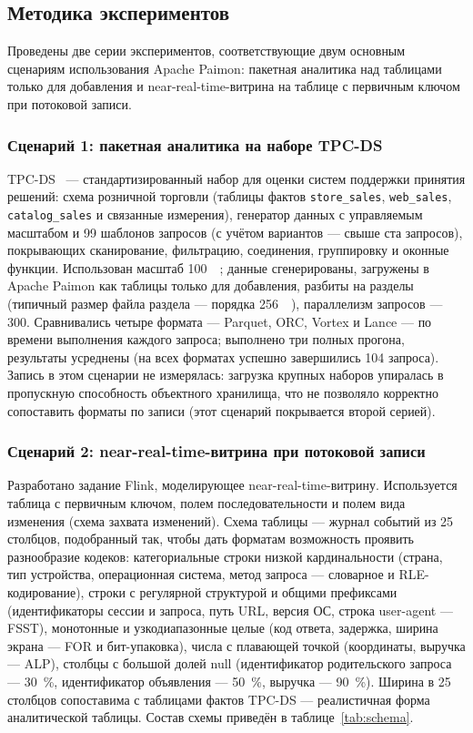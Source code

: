\subsection{Методика экспериментов}
\label{subsec:methodology}

Проведены две серии экспериментов, соответствующие двум основным сценариям
использования Apache Paimon: пакетная аналитика над таблицами только для добавления и
near-real-time-витрина на таблице с первичным ключом при потоковой записи.

\subsubsection{Сценарий 1: пакетная аналитика на наборе TPC-DS}

TPC-DS~\cite{tpcds-spec} --- стандартизированный набор для оценки систем поддержки принятия решений:
схема розничной торговли (таблицы фактов \texttt{store\_sales}, \texttt{web\_sales},
\texttt{catalog\_sales} и связанные измерения), генератор данных с управляемым
масштабом и \num{99} шаблонов запросов (с учётом вариантов --- свыше ста запросов),
покрывающих сканирование, фильтрацию, соединения, группировку и оконные функции.
Использован масштаб \SI{100}{\giga\byte}; данные сгенерированы, загружены в Apache
Paimon как таблицы только для добавления, разбиты на разделы (типичный размер файла
раздела --- порядка \SI{256}{\mega\byte}), параллелизм запросов --- 300. Сравнивались
четыре формата --- Parquet, ORC, Vortex и Lance --- по времени выполнения каждого
запроса; выполнено три полных прогона, результаты усреднены (на всех форматах
успешно завершились \num{104} запроса). Запись в
этом сценарии не измерялась: загрузка крупных наборов упиралась в пропускную
способность объектного хранилища, что не позволяло корректно сопоставить форматы по
записи (этот сценарий покрывается второй серией).

\subsubsection{Сценарий 2: near-real-time-витрина при потоковой записи}

Разработано задание Flink, моделирующее near-real-time-витрину. Используется таблица
с первичным ключом, полем последовательности и полем вида изменения (схема захвата
изменений). Схема таблицы --- журнал событий из 25 столбцов, подобранный так, чтобы
дать форматам возможность проявить разнообразие кодеков: категориальные строки
низкой кардинальности (страна, тип устройства, операционная система, метод запроса
--- словарное и RLE-кодирование), строки с регулярной структурой и общими
префиксами (идентификаторы сессии и запроса, путь URL, версия ОС, строка
user-agent --- FSST), монотонные и узкодиапазонные целые (код ответа, задержка,
ширина экрана --- FOR и бит-упаковка), числа с плавающей точкой (координаты, выручка
--- ALP), столбцы с большой долей null (идентификатор родительского запроса ---
\SI{30}{\percent}, идентификатор объявления --- \SI{50}{\percent}, выручка ---
\SI{90}{\percent}). Ширина в 25 столбцов сопоставима с таблицами фактов TPC-DS ---
реалистичная форма аналитической таблицы. Состав схемы приведён в
таблице~\ref{tab:schema}.

